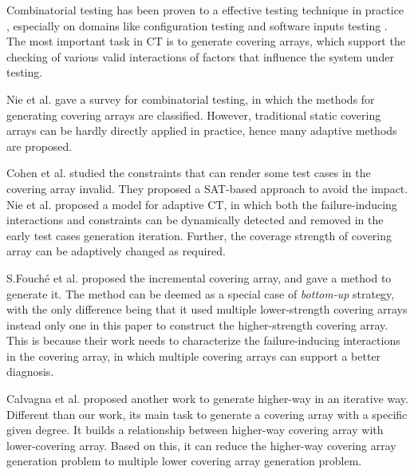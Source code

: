 \documentclass[conference]{IEEEtran}
\theoremstyle{definition}
\begin{document}
Combinatorial testing has been proven to a effective testing technique in practice \cite{kuhn2010practical}, especially on domains like configuration testing \cite{yilmaz2006covering,cohen2006testing,qu2008configuration} and software inputs testing \cite{cohen1997aetg,borazjany2012combinatorial,ghandehari2013applying}. The most important task in CT is to generate covering arrays, which support the checking of various valid interactions of factors that influence the system under testing.

Nie et al. \cite{nie2011survey} gave a survey for combinatorial testing, in which the methods for generating covering
arrays are classified. However, traditional static covering arrays can be hardly directly applied in practice, hence many adaptive methods are proposed.

Cohen et al. \cite{cohen2007exploiting,cohen2008constructing} studied the constraints that can render some test cases in the covering array invalid. They proposed a SAT-based approach to avoid the impact.
Nie et al.\cite{nie2013adaptive} proposed a model for adaptive CT, in which both the failure-inducing interactions and constraints can be dynamically detected and removed in the early test cases generation iteration. Further, the coverage strength of covering array can be adaptively changed as required.

S.Fouch{\'e}  et al. \cite{fouche2009incremental} proposed the incremental covering array, and gave a method to generate it. The method can be deemed as a special case of \emph{bottom-up} strategy, with the only difference being that it used multiple lower-strength covering arrays instead only one in this paper to construct the higher-strength covering array. This is because their work needs to characterize the failure-inducing interactions in the covering array, in which multiple covering arrays can support a better diagnosis.

Calvagna et al. \cite{calvagna2013incrementally} proposed another work to generate higher-way in an iterative way. Different than our work, its main task to generate a covering array with a specific given degree. It builds a relationship between higher-way covering array with lower-covering array.  Based on this, it can reduce the higher-way covering array generation problem to multiple lower covering array generation problem.
%
\end{document}
